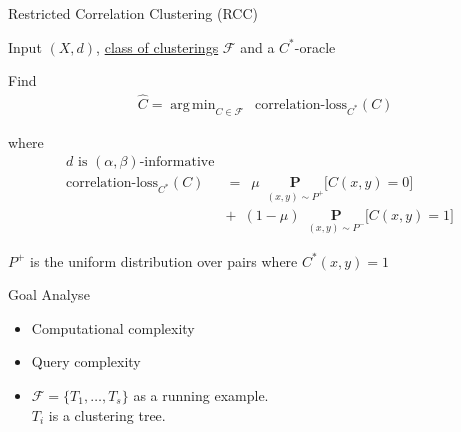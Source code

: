 \documentclass{beamer}
\newcommand{\mc}{\mathcal}
\newcommand{\mb}{\mathbf}
\DeclareMathOperator*{\argmin}{arg\,min}
\begin{document}
\begin{frame}[label=RCC]{Restricted Correlation Clustering (RCC)}
	\begin{block}{Input}
		$(X, d)$, \hyperlink{RCCVariations}{class of clusterings} $\mc F$ and a $C^*$-oracle
	\end{block}
	
	\vspace{10pt}\begin{block}{Find}
		\vspace{-15pt}\begin{align*}
		  &\hat C = \argmin_{C \in \mc F} \enspace \text{correlation-loss}_{C^*}(C)
		\end{align*}	
	\end{block}
	
	\begin{block}{where}
		\vspace{-20pt}\begin{align*}
			d \text{ is }(\alpha, \beta)\text{-informative}&\\
			\text{correlation-loss}_{C^*}(C) &= \enspace  \mu \enspace \underset{(x, y) \sim P^+}{\mb P} \big[ C(x, y) = 0 ] \\
			&+\enspace (1-\mu) \enspace \underset{(x, y) \sim P^-}{\mb P} \big[ C(x, y) = 1] 
		\end{align*}
	\end{block}	
	$P^+$ is the uniform distribution over pairs where $C^*(x, y) = 1$
\end{frame}

\begin{frame}{Goal}
Analyse
	\begin{itemize}
		\vspace{15pt}\item Computational complexity
		\vspace{15pt}\item Query complexity
		\vspace{20pt}\item $\mc F = \{T_1, \ldots, T_s\}$ as a running example.\\
		\vspace{10pt}$T_i$ is a clustering tree.
	\end{itemize}
\end{frame}
\end{document}

